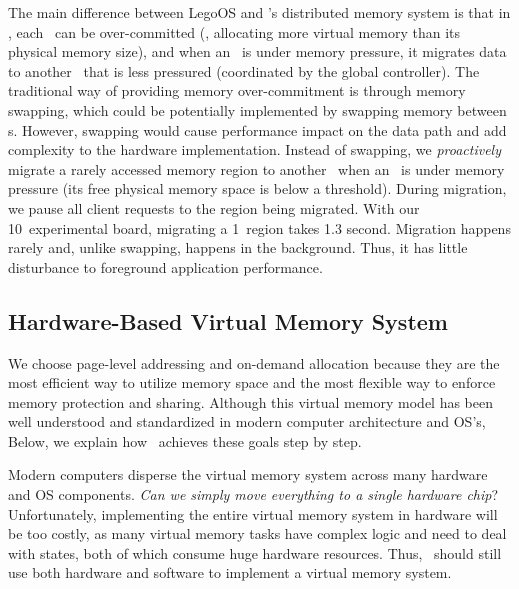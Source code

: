 The main difference between LegoOS and \sys's distributed memory system is that in \sys, each \MN\ can be over-committed (\ie, allocating more virtual memory than its physical memory size), and when an \MN\ is under memory pressure, it migrates data to another \MN\ that is less pressured (coordinated by the global controller).
The traditional way of providing memory over-commitment is through memory swapping, which could be potentially implemented by swapping memory between \MN{}s. 
However, swapping would cause performance impact on the data path and add complexity to the hardware implementation.
Instead of swapping, we \textit{proactively} migrate a rarely accessed memory region to another \MN\ when an \MN\ is under memory pressure (its free physical memory space is below a threshold).
During migration, we pause all client requests to the region being migrated.
With our 10\Gbps\ experimental board, migrating a 1\GB\ region takes 1.3 second.
Migration happens rarely and, unlike swapping, happens in the background.
Thus, it has little disturbance to foreground application performance.



\subsection{Hardware-Based Virtual Memory System} 
\label{sec:memory}

We choose page-level addressing and on-demand allocation because they are the most 
efficient way to utilize memory space
and the most flexible way to enforce memory protection and sharing.
Although this virtual memory model has been well understood and standardized in modern computer architecture and OS's,
Below, we explain how \sys\ achieves these goals step by step.

Modern computers disperse the virtual memory system across many hardware and OS components.
\textit{Can we simply move everything to a single hardware chip}?
Unfortunately, implementing the entire virtual memory system in hardware will be too costly,
as many virtual memory tasks have complex logic and need to deal with states,
both of which consume huge hardware resources. %
Thus, \sysboard\ should still use both hardware and software to implement a virtual memory system.

